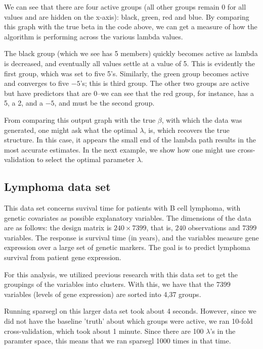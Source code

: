 \documentclass[12pt]{article}
\newcommand{\pkg}[1]{{\normalfont\fontseries{b}\selectfont #1}}
\begin{document}
We can see that there are four active groups (all other groups remain 0 for all values and are hidden on the x-axis): black, green, red and blue. By comparing this graph with the true beta in the code above, we can get a measure of how the algorithm is performing across the various lambda values.

The black group (which we see has 5 members) quickly becomes active as lambda is decreased, and eventually all values settle at a value of 5. This is evidently the first group, which was set to five 5's. Similarly, the green group becomes active and converges to five $-5$'s; this is third group. The other two groups are active but have predictors that are 0--we can see that the red group, for instance, has a 5, a 2, and a $-5$, and must be the second group.

From comparing this output graph with the true $\beta$, with which the data was generated, one might ask what the optimal $\lambda$, is, which recovers the true structure. In this case, it appears the small end of the lambda path results in the most accurate estimates. In the next example, we show how one might use cross-validation to select the optimal parameter $\lambda$.

\subsection{Lymphoma data set}

This data set concerns suvival time for patients with B cell lymphoma, with genetic covariates as possible explanatory variables. The dimensions of the data are as follows: the design matrix is $ 240\times 7399$, that is, $240$ observations and $7399$ variables. The response is survival time (in years), and the variables measure gene expression over a large set of genetic markers. The goal is to predict lymphoma survival from patient gene expression.

For this analysis, we utilized previous research with this data set to get the groupings of the variables into clusters. With this, we have that the 7399 variables (levels of gene expression) are sorted into 4,37 groups.

Running \pkg{sparsegl} on this larger data set took about 4 seconds. However, since we did not have the baseline 'truth' about which groups were active, we ran 10-fold cross-validation, which took about 1 minute. Since there are 100 $\lambda$'s in the paramter space, this means that we ran \pkg{sparsegl} 1000 times in that time.
\end{document}
